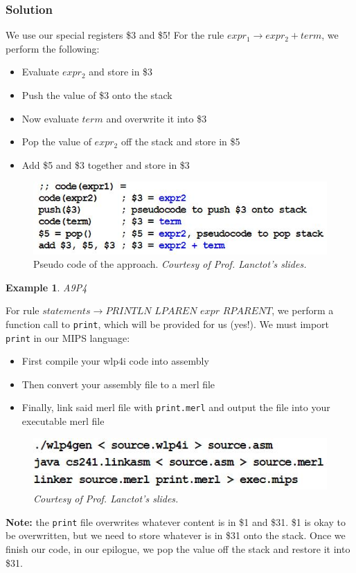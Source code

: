 \documentclass{report}
\newtheorem{ex}{Example}[section]
\begin{document}
\subsubsection{Solution}
We use our special registers \$3 and \$5!
For the rule $expr_1 \rightarrow expr_2 + term$, we perform the following:
\begin{itemize}
\item Evaluate $expr_2$ and store in \$3
\item Push the value of \$3 onto the stack
\item Now evaluate $term$ and overwrite it into \$3
\item Pop the value of $expr_2$ off the stack and store in \$5
\item Add \$5 and \$3 together and store in \$3
\end{itemize}
\begin{figure}[ht]
\begin{center}
\includegraphics[scale=0.5]{a9p3-2.jpg}
\end{center}
\caption{Pseudo code of the approach. \textit{Courtesy of Prof. Lanctot's slides.}}
\end{figure}
\begin{ex}
A9P4
\end{ex}
For rule $statements \rightarrow PRINTLN \,\, LPAREN \,\,expr\,\, RPARENT$, we perform a function call to \texttt{print}, which will be provided for us (yes!). We must import \texttt{print} in our MIPS language:
\begin{itemize}
\item First compile your wlp4i code into assembly
\item Then convert your assembly file to a merl file
\item Finally, link said merl file with \texttt{print.merl} and output the file into your executable merl file
\end{itemize}
\begin{figure}[ht]
\begin{center}
\includegraphics[scale=0.7]{linker.jpg}
\end{center}
\caption{\textit{Courtesy of Prof. Lanctot's slides.}}
\end{figure}
\textbf{Note:} the \texttt{print} file overwrites whatever content is in \$1 and \$31. \$1 is okay to be overwritten, but we need to store whatever is in \$31 onto the stack. Once we finish our code, in our epilogue, we pop the value off the stack and restore it into \$31.
\end{document}
